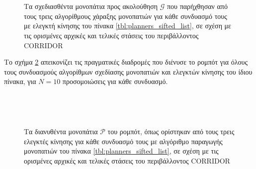 \begin{figure}\centering
  \begin{subfigure}[t]{\linewidth}
    \centering
    
  \end{subfigure}\\%
  \vspace{-1cm}
  \begin{subfigure}[t]{\linewidth}
    \centering
    
  \end{subfigure}\\%
  \vspace{-1cm}
  \begin{subfigure}[t]{\linewidth}
    \centering
    
  \end{subfigure}%
  \caption{\small Τα σχεδιασθέντα μονοπάτια προς ακολούθηση $\bm{\mathcal{G}}$
           που παρήχθησαν από τους τρεις αλγορίθμους χάραξης μονοπατιών για
           κάθε συνδυασμό τους με ελεγκτή κίνησης του πίνακα
           \ref{tbl:planners_sifted_list}, σε σχέση με τις ορισμένες αρχικές και
           τελικές στάσεις του περιβάλλοντος CORRIDOR}
  \label{fig:global_plans:corridor}
\end{figure}

Το σχήμα \ref{fig:ground_truths:corridor} απεικονίζει τις πραγματικές διαδρομές
που διένυσε το ρομπότ για όλους τους συνδυασμούς αλγορίθμων σχεδίασης μονοπατιών
και ελεγκτών κίνησης του ίδιου πίνακα, για $N=10$ προσομοιώσεις για κάθε
συνδυασμό.

\begin{figure}\centering
  \begin{subfigure}[t]{\linewidth}
    \centering
    
  \end{subfigure}\\%
  \vspace{-1cm}
  \begin{subfigure}[t]{\linewidth}
    \centering
    
  \end{subfigure}\\%
  \vspace{-1cm}
  \begin{subfigure}[t]{\linewidth}
    \centering
    
  \end{subfigure}%
  \caption{\small Τα διανυθέντα μονοπάτια $\bm{\mathcal{P}}$ του ρομπότ, όπως
           ορίστηκαν από τους τρεις ελεγκτές κίνησης για κάθε συνδυασμό τους με
           αλγόριθμο παραγωγής μονοπατιών του πίνακα
           \ref{tbl:planners_sifted_list}, σε σχέση με τις ορισμένες αρχικές και
           τελικές στάσεις του περιβάλλοντος CORRIDOR}
  \label{fig:ground_truths:corridor}
\end{figure}


